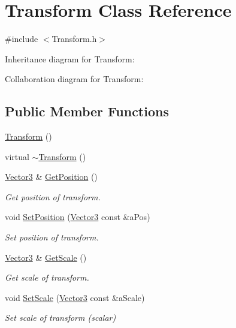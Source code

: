 \hypertarget{classTransform}{}\section{Transform Class Reference}
\label{classTransform}


{\ttfamily \#include $<$Transform.\+h$>$}



Inheritance diagram for Transform\+:


Collaboration diagram for Transform\+:
\subsection*{Public Member Functions}
\begin{DoxyCompactItemize}
\item 
\hyperlink{classTransform_aa08ca4266efabc768973cdeea51945ab}{Transform} ()
\item 
virtual \hyperlink{classTransform_aa72e286c069850db80927b0e6554cd3e}{$\sim$\+Transform} ()
\item 
\hyperlink{structVector3}{Vector3} \& \hyperlink{classTransform_a6f7c1d76bb7d9088637ed9b051d5d3a9}{Get\+Position} ()
\begin{DoxyCompactList}\small\item\em Get position of transform. \end{DoxyCompactList}\item 
void \hyperlink{classTransform_a51fcdcaeb8fe967992f1251d1ac27d73}{Set\+Position} (\hyperlink{structVector3}{Vector3} const \&a\+Pos)
\begin{DoxyCompactList}\small\item\em Set position of transform. \end{DoxyCompactList}\item 
\hyperlink{structVector3}{Vector3} \& \hyperlink{classTransform_a8226e7e405220b9afc1f7594a563ef09}{Get\+Scale} ()
\begin{DoxyCompactList}\small\item\em Get scale of transform. \end{DoxyCompactList}\item 
void \hyperlink{classTransform_a14675ce0b8d06a75317b777fe7c4deed}{Set\+Scale} (\hyperlink{structVector3}{Vector3} const \&a\+Scale)
\begin{DoxyCompactList}\small\item\em Set scale of transform (scalar) \end{DoxyCompactList}\item 

\end{DoxyCompactItemize}
